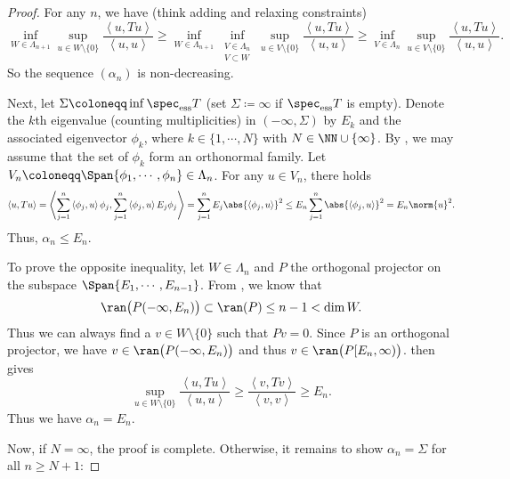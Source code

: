 \documentclass[oneside,reqno,letterpaper]{amsart}
\newcommand{\essspec}{\spec_{\text{ess}}}
\begin{document}
\begin{proof}
  For any \(n\), we have (think adding and relaxing constraints)
  \[
    \inf_{W \in \Lambda_{n + 1}} \sup_{u \in W \setminus \{0\}} \frac{\left< u, Tu \right>}{\left< u, u \right>} 
    \geq \inf_{W \in \Lambda_{n + 1}} \inf_{\substack{V \in \Lambda_n\\ V\subset W}} \sup_{u \in V \setminus \{0\}} \frac{\left< u, Tu \right>}{\left< u, u \right>} 
    \geq \inf_{V \in \Lambda_n} \sup_{u \in V \setminus \{0\}} \frac{\left< u, Tu \right>}{\left< u, u \right>} . 
  \]
  So the sequence \((\alpha_n)\) is non-decreasing. 

  Next, let \(\Sigma \coloneqq \inf \essspec T\) (set \(\Sigma \coloneqq \infty\) if \(\essspec T\) is empty).
  Denote the \(k\)th eigenvalue (counting multiplicities) in \((-\infty, \Sigma)\) by \(E_k\) and the associated eigenvector \(\phi_k\), where \(k \in \{1, \cdots, N\}\) with \(N \in \NN \cup \{\infty\}\). 
  By , we may assume that the set of \(\phi_k\) form an orthonormal family. 
  Let \(V_n \coloneqq \Span \{\phi_1, \cdots, \phi_n\} \in \Lambda_n\).
  For any \(u \in V_n\), there holds
  \begin{align*}
    \left< u, Tu \right>
    = \left< \sum_{j=1}^{n} \left< \phi_j, u \right> \phi_j, \sum_{j=1}^{n} \left< \phi_j, u \right> E_j \phi_j \right>
    = \sum_{j=1}^{n} E_j \abs{\left< \phi_j, u \right>}^2 
    \leq E_n \sum_{j=1}^{n} \abs{\left< \phi_j, u \right>}^2 
    =  E_n \norm{u}^2 . 
  \end{align*}
  Thus, \(\alpha_n \leq E_n\). 

  To prove the opposite inequality, let \(W \in \Lambda_n\) and \(P\) the orthogonal projector on the subspace \(\Span \{E_1, \cdots, E_{n - 1}\}\). 
  From , we know that 
  \[
    \ran\big(P(-\infty, E_n)\big) \subset \ran(P) \leq n - 1 < \dim W. 
  \]
  Thus we can always find a \(v \in W \setminus \{0\}\) such that \(P v = 0\). 
  Since \(P\) is an orthogonal projector, we have \(v \in \ran\big(P(-\infty, E_n)\big)\) and thus \(v \in \ran\big(P[E_n, \infty)\big)\). 
   then gives 
  \[
    \sup_{u \in W \setminus \{0\}} \frac{\left< u, T u \right>}{\left< u, u \right>}
    \geq \frac{\left< v, Tv \right>}{\left< v, v \right>}
    \geq E_n. 
  \] 
  Thus we have \(\alpha_n = E_n\). 

  Now, if \(N = \infty\), the proof is complete. 
  Otherwise, it remains to show \(\alpha_n = \Sigma\) for all \(n \geq N + 1\): 


\end{proof}
\end{document}
